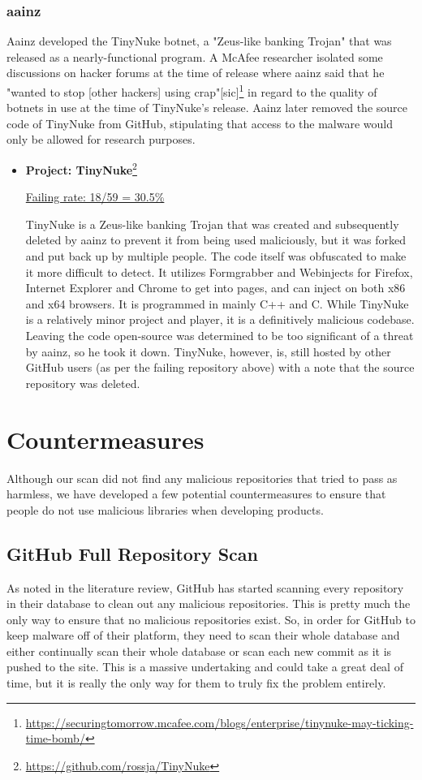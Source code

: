 \documentclass[]{acmart}
\begin{document}
\subsubsection{aainz}
Aainz developed the TinyNuke botnet, a "Zeus-like banking Trojan" that was released as a nearly-functional program. A McAfee researcher isolated some discussions on hacker forums at the time of release where aainz said that he  "wanted to stop [other hackers] using crap"[sic]\footnote{\url{https://securingtomorrow.mcafee.com/blogs/enterprise/tinynuke-may-ticking-time-bomb/}} in regard to the quality of botnets in use at the time of TinyNuke's release. Aainz later removed the source code of TinyNuke from GitHub, stipulating that access to the malware would only be allowed for research purposes. 
\begin{itemize}
    \item { \bf Project: TinyNuke}\footnote{\url{https://github.com/rossja/TinyNuke}}

    \underline{ Failing rate: 18/59 = 30.5\% }
    
    TinyNuke is a Zeus-like banking Trojan that was created and subsequently deleted by aainz to prevent it from being used maliciously, but it was forked and put back up by multiple people. The code itself was obfuscated to make it more difficult to detect. It utilizes Formgrabber and Webinjects for Firefox, Internet Explorer and Chrome to get into pages, and can inject on both x86 and x64 browsers. It is programmed in mainly C++ and C. While TinyNuke is a relatively minor project and player, it is a definitively malicious codebase. Leaving the code open-source was determined to be too significant of a threat by aainz, so he took it down. TinyNuke, however, is, still hosted by other GitHub users (as per the failing repository above) with a note that the source repository was deleted.
\end{itemize}
\section{Countermeasures}
Although our scan did not find any malicious repositories that tried to pass as harmless, we have developed a few potential countermeasures to ensure that people do not use malicious libraries when developing products.
\subsection{GitHub Full Repository Scan}
As noted in the literature review, GitHub has started scanning every repository in their database to clean out any malicious repositories. This is pretty much the only way to ensure that no malicious repositories exist. So, in order for GitHub to keep malware off of their platform, they need to scan their whole database and either continually scan their whole database or scan each new commit as it is pushed to the site. This is a massive undertaking and could take a great deal of time, but it is really the only way for them to truly fix the problem entirely.
\end{document}
